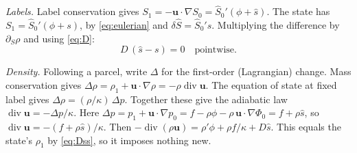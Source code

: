 \documentclass[11pt]{article}
\theoremstyle{definition}
\theoremstyle{remark}
\newcommand{\bu}{\mathbf{u}}
\newcommand{\Div}{\operatorname{div}}
\begin{document}
\emph{Labels.} Label conservation gives $S_1 = -\bu\cdot\nabla S_0 =
\hat S_0'(\phi + \hat s)$. The state has $S_1 = \hat S_0'(\phi + s)$, by
\eqref{eq:eulerian} and $\delta\hat S = \hat S_0's$. Multiplying the
difference by $\partial_S\rho$ and using \eqref{eq:D}:
\begin{equation}
  D\,(\hat s - s) = 0\quad\text{pointwise.}
  \label{eq:Dss}
\end{equation}

\emph{Density.} Following a parcel, write $\Delta$ for the first-order
(Lagrangian) change. Mass conservation gives $\Delta\rho = \rho_1 +
\bu\cdot\nabla\rho = -\rho\Div\bu$. The equation of state at fixed
label gives $\Delta\rho = (\rho/\kappa)\,\Delta p$. Together these give
the adiabatic law $\Div\bu = -\Delta p/\kappa$. Here $\Delta p = p_1 +
\bu\cdot\nabla p_0 = f - \rho\phi - \rho\,\bu\cdot\nabla\Phi_0 = f +
\rho\hat s$, so $\Div\bu = -(f + \rho\hat s)/\kappa$. Then
$-\Div(\rho\bu) = \rho'\phi + \rho f/\kappa + D\hat s$. This equals the
state's $\rho_1$ by \eqref{eq:Dss}, so it imposes nothing new.
\end{document}
